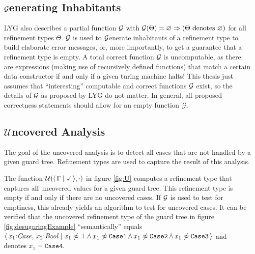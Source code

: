\subsection{$\mathcal{G}$enerating Inhabitants}
LYG also describes a partial function $\mathcal{G}$
with $\mathcal{G}(\Theta) = \varnothing \Rightarrow (\Theta \text{ denotes } \varnothing)$ for all refinement types $\Theta$.
$\mathcal{G}$ is used to $\mathcal{G}$enerate inhabitants of a refinement type to build elaborate error messages, or, more importantly, to get a guarantee that a refinement type is empty.
A total correct function $\mathcal{G}$ is uncomputable, as there are expressions (making use of recursively defined functions) that match a certain data constructor if and only if a given turing machine halts!
This thesis just assumes that ``interesting'' computable and correct functions $\mathcal{G}$ exist,
so the details of $\mathcal{G}$ as proposed by LYG do not matter.
In general, all proposed correctness statements should allow for an empty function $\mathcal{G}$.

\subsection{$\mathcal{U}$ncovered Analysis}
\label{chap:bckgrdUncoveredAnalysis}

The goal of the uncovered analysis is to detect all cases that are not handled by a given guard tree.
Refinement types are used to capture the result of this analysis.

The function $\unc(\reft{\Gamma}{\true}, \cdot)$ in figure \ref{fig:U}
computes a refinement type that captures all uncovered values for a given guard tree.
This refinement type is empty if and only if there are no uncovered cases.
If $\mathcal{G}$ is used to test for emptiness, this already yields an algorithm to test for uncovered cases.
It can be verified that the uncovered refinement type of the guard tree in
figure \ref{fig:desugaringExample} ``semantically'' equals $\langle \,  x_1{:}\mathit{Case}, \, x_2{:}\mathit{Bool} \mid  x_1 \not\approx \bot \,\dot{\wedge}\, x_1 \not\approx \mathtt{Case1} \,\dot{\wedge}\, x_1 \not\approx \mathtt{Case2} \,\dot{\wedge}\, x_1 \not\approx \mathtt{Case3}  \, \rangle$ and denotes $x_1 = \mathtt{Case4}$.

